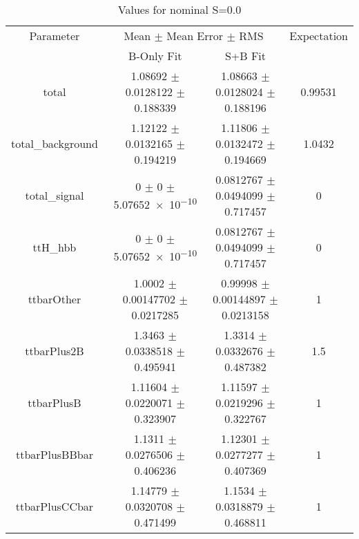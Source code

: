 \begin{table}
\centering
\caption{Values for nominal S=0.0}
\begin{tabular}{cccc}
\toprule
Parameter & \multicolumn{2}{c}{Mean $\pm$ Mean Error $\pm$ RMS} & Expectation\\
 & B-Only Fit & S+B Fit & \\
\midrule
total & \num{1.08692} $\pm$ \num{0.0128122} $\pm$ \num{0.188339} & \num{1.08663} $\pm$ \num{0.0128024} $\pm$ \num{0.188196} & \num{0.99531}\\
total\_background & \num{1.12122} $\pm$ \num{0.0132165} $\pm$ \num{0.194219} & \num{1.11806} $\pm$ \num{0.0132472} $\pm$ \num{0.194669} & \num{1.0432}\\
total\_signal & \num{0} $\pm$ \num{0} $\pm$ \num{5.07652e-10} & \num{0.0812767} $\pm$ \num{0.0494099} $\pm$ \num{0.717457} & \num{0}\\
ttH\_hbb & \num{0} $\pm$ \num{0} $\pm$ \num{5.07652e-10} & \num{0.0812767} $\pm$ \num{0.0494099} $\pm$ \num{0.717457} & \num{0}\\
ttbarOther & \num{1.0002} $\pm$ \num{0.00147702} $\pm$ \num{0.0217285} & \num{0.99998} $\pm$ \num{0.00144897} $\pm$ \num{0.0213158} & \num{1}\\
ttbarPlus2B & \num{1.3463} $\pm$ \num{0.0338518} $\pm$ \num{0.495941} & \num{1.3314} $\pm$ \num{0.0332676} $\pm$ \num{0.487382} & \num{1.5}\\
ttbarPlusB & \num{1.11604} $\pm$ \num{0.0220071} $\pm$ \num{0.323907} & \num{1.11597} $\pm$ \num{0.0219296} $\pm$ \num{0.322767} & \num{1}\\
ttbarPlusBBbar & \num{1.1311} $\pm$ \num{0.0276506} $\pm$ \num{0.406236} & \num{1.12301} $\pm$ \num{0.0277277} $\pm$ \num{0.407369} & \num{1}\\
ttbarPlusCCbar & \num{1.14779} $\pm$ \num{0.0320708} $\pm$ \num{0.471499} & \num{1.1534} $\pm$ \num{0.0318879} $\pm$ \num{0.468811} & \num{1}\\
\bottomrule
\end{tabular}
\end{table}